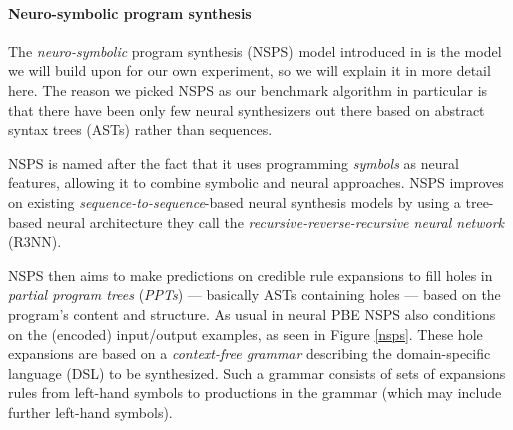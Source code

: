 \documentclass{article}
\begin{document}
\paragraph{Neuro-symbolic program synthesis} \label{sec:nsps}

The \emph{neuro-symbolic} program synthesis (NSPS) model introduced in \citet{nsps}
is the model we will build upon for our own experiment, so we will explain it in more detail here.
The reason we picked NSPS as our benchmark algorithm in particular is
that there have been only few neural synthesizers out there
based on abstract syntax trees (ASTs) rather than sequences.

NSPS is named after the fact that it uses programming \emph{symbols} as neural features,
allowing it to combine symbolic and neural approaches.
NSPS improves on existing \emph{sequence-to-sequence}-based neural synthesis models
by using a tree-based neural architecture they call the
\emph{recursive-reverse-recursive neural network} (R3NN).

NSPS then aims to make predictions on credible rule expansions to fill holes
in \emph{partial program trees} (\emph{PPTs}) --- basically ASTs containing holes --- based on the program's content and structure.
As usual in neural PBE NSPS also conditions on the (encoded) input/output examples, as seen in Figure \ref{nsps}.
These hole expansions are based on a \emph{context-free grammar} describing the domain-specific language (DSL) to be synthesized.
Such a grammar consists of sets of expansions rules from left-hand symbols to productions in the grammar (which may include further left-hand symbols).
\end{document}
